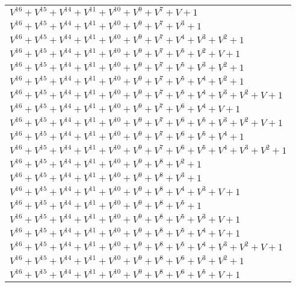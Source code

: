 \documentclass[12pt]{article}
\begin{document}
\begin{adjustwidth}{-4cm}{}
\begin{center}
\begin{longtable}{|l|}
$V^{16}  +V^{15}  +V^{14}  +V^{11}  +V^{10}  +V^{9}  +V^{7}  + V + 1$ \\
$V^{16}  +V^{15}  +V^{14}  +V^{11}  +V^{10}  +V^{9}  +V^{7}  +V^{3}  + 1$ \\
$V^{16}  +V^{15}  +V^{14}  +V^{11}  +V^{10}  +V^{9}  +V^{7}  +V^{4}  +V^{3}  +V^{2}  + 1$ \\
$V^{16}  +V^{15}  +V^{14}  +V^{11}  +V^{10}  +V^{9}  +V^{7}  +V^{5}  +V^{2}  + V + 1$ \\
$V^{16}  +V^{15}  +V^{14}  +V^{11}  +V^{10}  +V^{9}  +V^{7}  +V^{5}  +V^{3}  +V^{2}  + 1$ \\
$V^{16}  +V^{15}  +V^{14}  +V^{11}  +V^{10}  +V^{9}  +V^{7}  +V^{5}  +V^{4}  +V^{2}  + 1$ \\
$V^{16}  +V^{15}  +V^{14}  +V^{11}  +V^{10}  +V^{9}  +V^{7}  +V^{5}  +V^{4}  +V^{3}  +V^{2}  + V + 1$ \\
$V^{16}  +V^{15}  +V^{14}  +V^{11}  +V^{10}  +V^{9}  +V^{7}  +V^{6}  +V^{4}  + V + 1$ \\
$V^{16}  +V^{15}  +V^{14}  +V^{11}  +V^{10}  +V^{9}  +V^{7}  +V^{6}  +V^{5}  +V^{3}  +V^{2}  + V + 1$ \\
$V^{16}  +V^{15}  +V^{14}  +V^{11}  +V^{10}  +V^{9}  +V^{7}  +V^{6}  +V^{5}  +V^{4}  + 1$ \\
$V^{16}  +V^{15}  +V^{14}  +V^{11}  +V^{10}  +V^{9}  +V^{7}  +V^{6}  +V^{5}  +V^{4}  +V^{3}  +V^{2}  + 1$ \\
$V^{16}  +V^{15}  +V^{14}  +V^{11}  +V^{10}  +V^{9}  +V^{8}  +V^{2}  + 1$ \\
$V^{16}  +V^{15}  +V^{14}  +V^{11}  +V^{10}  +V^{9}  +V^{8}  +V^{3}  + 1$ \\
$V^{16}  +V^{15}  +V^{14}  +V^{11}  +V^{10}  +V^{9}  +V^{8}  +V^{4}  +V^{3}  + V + 1$ \\
$V^{16}  +V^{15}  +V^{14}  +V^{11}  +V^{10}  +V^{9}  +V^{8}  +V^{5}  + 1$ \\
$V^{16}  +V^{15}  +V^{14}  +V^{11}  +V^{10}  +V^{9}  +V^{8}  +V^{5}  +V^{3}  + V + 1$ \\
$V^{16}  +V^{15}  +V^{14}  +V^{11}  +V^{10}  +V^{9}  +V^{8}  +V^{5}  +V^{4}  + V + 1$ \\
$V^{16}  +V^{15}  +V^{14}  +V^{11}  +V^{10}  +V^{9}  +V^{8}  +V^{5}  +V^{4}  +V^{3}  +V^{2}  + V + 1$ \\
$V^{16}  +V^{15}  +V^{14}  +V^{11}  +V^{10}  +V^{9}  +V^{8}  +V^{6}  +V^{3}  +V^{2}  + 1$ \\
$V^{16}  +V^{15}  +V^{14}  +V^{11}  +V^{10}  +V^{9}  +V^{8}  +V^{6}  +V^{5}  + V + 1$ \\

\end{longtable}
\end{center}
\end{adjustwidth}
\end{document}
